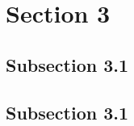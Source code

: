 \section{Section 3}
\label{sec:results}
\subsection{Subsection 3.1}

\subsection{Subsection 3.1}




\FloatBarrier %